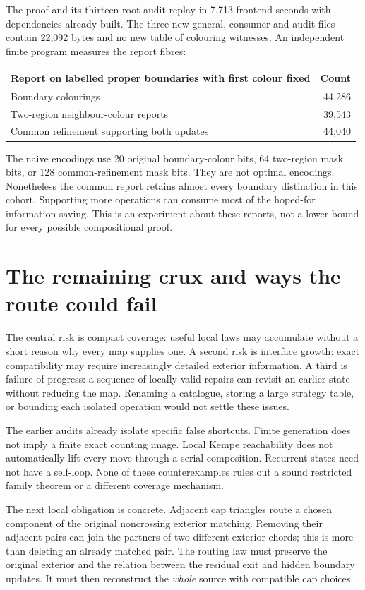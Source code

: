 The proof and its thirteen-root audit replay in 7.713 frontend seconds with
dependencies already built. The three new general, consumer and audit
files contain 22,092 bytes and no new table of colouring witnesses.
An independent finite program measures the report fibres:
\begin{center}
\small
\begin{tabular}{@{}lr@{}}
\toprule
Report on labelled proper boundaries with first colour fixed & Count \\
\midrule
Boundary colourings & 44,286 \\
Two-region neighbour-colour reports & 39,543 \\
Common refinement supporting both updates & 44,040 \\
\bottomrule
\end{tabular}
\end{center}
The naive encodings use 20 original boundary-colour bits, 64 two-region
mask bits, or 128 common-refinement mask bits. They are not optimal
encodings. Nonetheless the common report retains almost every boundary
distinction in this cohort. Supporting more operations can consume most
of the hoped-for information saving. This is an experiment about these
reports, not a lower bound for every possible compositional proof.

\section{The remaining crux and ways the route could fail}
\label{sec:current-crux}

The central risk is compact coverage: useful local laws may accumulate
without a short reason why every map supplies one. A second risk is
interface growth: exact compatibility may require increasingly detailed
exterior information. A third is failure of progress: a sequence of
locally valid repairs can revisit an earlier state without reducing the
map. Renaming a catalogue, storing a large strategy table, or bounding
each isolated operation would not settle these issues.

The earlier audits already isolate specific false shortcuts. Finite
generation does not imply a finite exact counting image. Local Kempe
reachability does not automatically lift every move through a serial
composition. Recurrent states need not have a self-loop. None of these
counterexamples rules out a sound restricted family theorem or a different
coverage mechanism.

The next local obligation is concrete. Adjacent cap triangles route a
chosen component of the original noncrossing exterior matching. Removing
their adjacent pairs can join the partners of two different exterior
chords; this is more than deleting an already matched pair. The routing
law must preserve the original exterior and the relation between the
residual exit and hidden boundary updates. It must then reconstruct the
\emph{whole} source with compatible cap choices.

